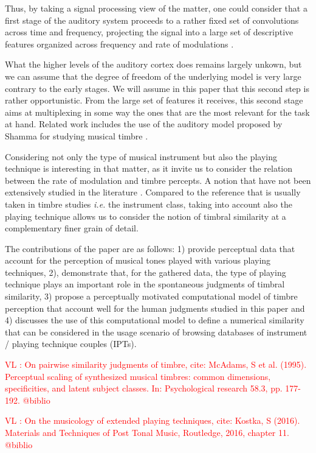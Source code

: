 \documentclass{article}
\newcommand{\ipts}{IPTs\xspace}
\newcommand{\vl}[1]{\textcolor{red}{VL : #1}}
\begin{document}
Thus, by taking a signal processing view of the matter, one could consider that a first stage of the auditory system proceeds to a rather fixed set of convolutions across time and frequency, projecting the signal into a large set of descriptive features organized across frequency and rate of modulations \cite{anden2014deep}.

What the higher levels of the auditory cortex does remains largely unkown, but we can assume that the degree of freedom of the underlying model is very large contrary to the early stages.  We will assume in this paper that this second step is rather opportunistic. From the large set of features it receives, this second stage aims at multiplexing in some way the ones that are the most relevant for the task at hand. Related work includes the use of the auditory model proposed by Shamma for studying musical timbre \cite{patil2012music}.

Considering not only the type of musical instrument but also the playing technique is interesting in that matter, as it invite us to consider the relation between the rate of modulation and timbre percepts. A notion that have not been extensively studied in the literature \cite{burred2010dynamic}. Compared to the reference that is usually taken in timbre studies \textit{i.e.} the instrument class, taking into account also the playing technique allows us to consider the notion of timbral similarity at a complementary finer grain of detail.

The contributions of the paper are as follows: 1) provide perceptual data that account for the perception of musical tones played with various playing techniques, 2), demonstrate that, for the gathered data, the type of playing technique plays an important role in the spontaneous judgments of timbral similarity, 3) propose a perceptually motivated computational model of timbre perception that account well for the human judgments studied in this paper and 4) discusses the use of this computational model to define a numerical similarity that can be considered in the usage scenario of browsing databases of instrument / playing technique couples (\ipts).

\vl{On pairwise similarity judgments of timbre, cite:
McAdams, S et al. (1995). Perceptual scaling of synthesized musical
timbres: common dimensions, specificities, and latent subject
classes. In: Psychological research 58.3, pp. 177-192.
@biblio}

\vl{On the musicology of extended playing techniques, cite:
Kostka, S (2016). Materials and Techniques of Post Tonal Music, Routledge, 2016, chapter 11. @biblio}
\end{document}
